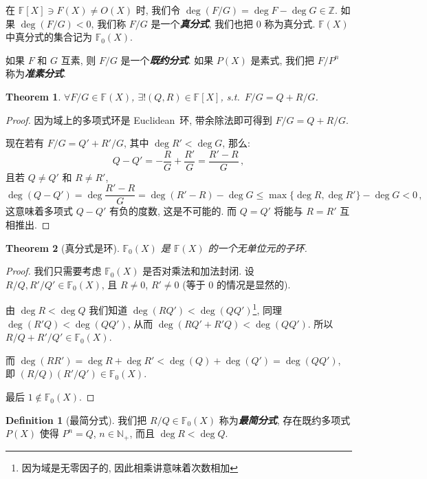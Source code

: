 \documentclass[openany]{ctexbook}
\newcommand*{\indexbf}[1]{\emph{\textbf{#1}}\index{#1}} %
\theoremstyle{plain}
\newtheorem{theorem}{Theorem}[section] %
\theoremstyle{definition}
\newtheorem{definition}{Definition}[section] %
\begin{document}
在 $\mathbb F[X] \ni F(X) \neq O(X)$ 时, 我们令 $\deg (F/G) = \deg F - \deg G \in \mathbb Z$. 如果 $\deg (F/G) < 0$, 我们称 $F/G$ 是一个\indexbf{真分式}, 我们也把 $0$ 称为真分式. $\mathbb F(X)$ 中真分式的集合记为 $\mathbb F_0(X)$.

如果 $F$ 和 $G$ 互素, 则 $F/G$ 是一个\indexbf{既约分式}. 如果 $P(X)$ 是素式, 我们把 $F/P^n$ 称为\indexbf{准素分式}.

\begin{theorem}
	$\forall F/G \in \mathbb F(X)$, $\exists! (Q, R) \in \mathbb F[X]$, s.t.\ $F/G = Q + R/G$. 
\end{theorem}
\begin{proof}
	因为域上的多项式环是 Euclidean~环, 带余除法即可得到 $F/G = Q + R/G$.

	现在若有 $F/G = Q' + R'/G$, 其中 $\deg R' < \deg G$, 那么:
	\begin{equation*}
		Q - Q' = - \frac{R}{G} + \frac{R'}{G}
			= \frac{R' - R}{G}\,,
	\end{equation*}
	且若 $Q \neq Q'$ 和 $R \neq R'$, 
	\begin{equation*}
		\deg (Q - Q') = \deg \frac{R' - R}{G} 
			= \deg (R' - R) - \deg G \leq \max\{\deg R, \deg R'\} - \deg G
			< 0\,,
	\end{equation*}
	这意味着多项式 $Q - Q'$ 有负的度数, 这是不可能的. 而 $Q = Q'$ 将能与 $R = R'$ 互相推出. 
\end{proof}

\begin{theorem}[真分式是环]
	$\mathbb F_0(X)$ 是 $\mathbb F(X)$ 的一个无单位元的子环.
\end{theorem}
\begin{proof}
	我们只需要考虑 $\mathbb F_0(X)$ 是否对乘法和加法封闭.
	设 $R/Q, R'/Q' \in \mathbb F_0(X)$, 且 $R \neq 0$, $R' \neq 0$ (等于 $0$ 的情况是显然的). 
	
	由 $\deg R < \deg Q$ 我们知道 $\deg (RQ') < \deg (QQ')$\footnote{因为域是无零因子的, 因此相乘讲意味着次数相加}, 同理 $\deg(R'Q) < \deg (QQ')$, 从而 $\deg(RQ' + R'Q) < \deg(QQ')$. 所以 $R/Q + R'/Q' \in \mathbb F_0(X)$.

	而 $\deg(RR') = \deg R + \deg R' < \deg(Q) + \deg(Q') = \deg(QQ')$, 即 $(R/Q)(R'/Q') \in \mathbb F_0(X)$. 

	最后 $1 \notin \mathbb F_0(X)$.
\end{proof}

\begin{definition}[最简分式]
	我们把 $R/Q \in \mathbb F_0(X)$ 称为\indexbf{最简分式}, 存在既约多项式 $P(X)$ 使得 $P^n = Q$, $n \in \mathbb N_+$, 而且 $\deg R < \deg Q$.
\end{definition}
\end{document}
